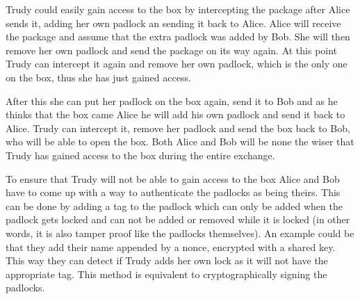Trudy could easily gain access to the box by intercepting the package after Alice sends it, adding her own padlock an sending it back to Alice. Alice will receive the package and assume that the extra padlock was added by Bob. She will then remove her own padlock and send the package on its way again. At this point Trudy can intercept it again and remove her own padlock, which is the only one on the box, thus she has just gained access.

After this she can put her padlock on the box again, send it to Bob and as he thinks that the box came Alice he will add his own padlock and send it back to Alice. Trudy can intercept it, remove her padlock and send the box back to Bob, who will be able to open the box. Both Alice and Bob will be none the wiser that Trudy has gained access to the box during the entire exchange.

To ensure that Trudy will not be able to gain access to the box Alice and Bob have to come up with a way to authenticate the padlocks as being theirs. This can be done by adding a tag to the padlock which can only be added when the padlock gets locked and can not be added or removed while it is locked (in other words, it is also tamper proof like the padlocks themselves). An example could be that they add their name appended by a nonce, encrypted with a shared key. This way they can detect if Trudy adds her own lock as it will not have the appropriate tag. This method is equivalent to cryptographically signing the padlocks.